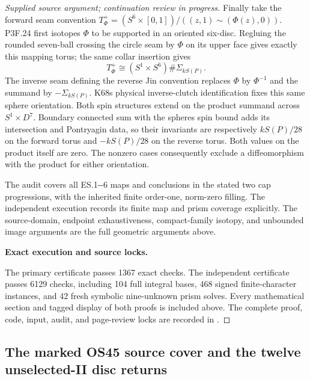\begin{proof}[Supplied source argument; continuation review in progress]
Finally take the forward seam convention
\(T^+_\Phi=(S^6\times[0,1])/((z,1)\sim(\Phi(z),0))\).
P3F.24 first isotopes \(\Phi\) to be supported in an oriented
six-disc. Regluing the rounded seven-ball crossing the circle seam
by \(\Phi\) on its upper face gives exactly this mapping torus;
the same collar insertion gives
\[
                 T^+_\Phi\cong
                    (S^1\times S^6)\#\Sigma_{kS(P)}.
 \tag{ESP.37}
\]
The inverse seam defining the reverse Jin convention replaces
\(\Phi\) by \(\Phi^{-1}\) and the summand by
\(-\Sigma_{kS(P)}\). K68\textquotesingle s physical inverse-clutch identification
fixes this same sphere orientation. Both spin structures extend
on the product summand across \(S^1\times D^7\). Boundary connected
sum with the sphere\textquotesingle s spin bound adds its intersection and
Pontryagin data, so their invariants are respectively
\(kS(P)/28\) on the forward torus and \(-kS(P)/28\) on the
reverse torus. Both values on the product itself are zero.
The nonzero cases consequently exclude a diffeomorphism with
the product for either orientation.

The audit covers all ES.1-\/-6 maps and conclusions in the stated
two cap progressions, with the inherited finite order-one,
norm-zero filling. The independent execution records its finite
map and prism coverage explicitly. The source-domain, endpoint
exhaustiveness, compact-family isotopy, and unbounded image
arguments are the full geometric arguments above.


\par\medskip\noindent\textbf{Exact execution and source locks.}\par
The primary certificate passes 1367 exact checks. The independent certificate passes 6129 checks, including 104 full integral bases, 468 signed finite-character instances, and 42 fresh symbolic nine-unknown prism solves. Every mathematical section and tagged display of both proofs is included above. The complete proof, code, input, audit, and page-review locks are recorded in .
\end{proof}


\subsection{The marked OS45 source cover and the twelve unselected-II disc returns}
